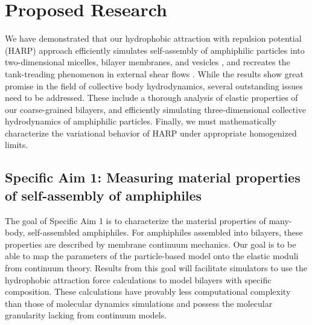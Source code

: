 \section{Proposed Research}
\label{sec:proposed-work}
We have demonstrated that our hydrophobic attraction with repulsion
potential (HARP) approach efficiently simulates self-assembly of
amphiphilic particles into two-dimensional micelles, bilayer membranes,
and vesicles \cite{Fu2018_SIAM}, and recreates the tank-treading
phenomenon in external shear flows \cite{Fu20} .
%
While the results show great promise in the field of collective body
hydrodynamics, several outstanding issues need to be addressed. These
include a thorough analysis of elastic properties of our coarse-grained
bilayers, and efficiently simulating three-dimensional collective
hydrodynamics of amphiphilic particles. Finally, we must mathematically
characterize the variational behavior of HARP under appropriate
homogenized limits.

\subsection{Specific Aim 1: Measuring material properties of self-assembly of amphiphiles}
\label{subsec:specific_aim_1}

The goal of Specific Aim 1 is to characterize the material properties of many-body, self-assembled amphiphiles.
For amphiphiles assembled into bilayers, these properties are described by membrane continuum mechanics.
Our goal is to be able to map the parameters of the particle-based model onto the elastic moduli from continuum theory.
Results from this goal will facilitate simulators to use the hydrophobic attraction force calculations
to model bilayers with specific composition. These calculations have provably less computational complexity than
those of molecular dynamics simulations and possess the molecular granularity lacking from continuum models.

